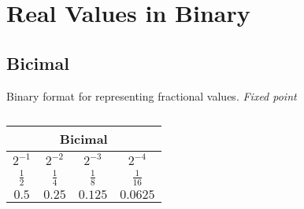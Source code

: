 \documentclass[]{book}
\author{Abdul Waajid}
\date{11th of October 2024}
\begin{document}
\section{Real Values in Binary}

\subsection{Bicimal}

Binary format for representing fractional values.
\textit{Fixed point}

\begin{table}[H]
    \begin{center}
        \begin{tabular}{|c|c|c|c|}
            \hline
            \multicolumn{4}{|c|}{Bicimal}\\ \hline
            $2^{-1}$ & $2^{-2}$ & $2^{-3}$ & $2^{-4}$\\ \hline
            $\frac{1}{2}$ & $\frac{1}{4}$ & $\frac{1}{8}$ &  $\frac{1}{16}$\\ \hline
            $0.5$ & $0.25$ & $0.125$ & $0.0625$\\ \hline
        \end{tabular}
    \end{center}
    \caption{}
\end{table}
\end{document}
